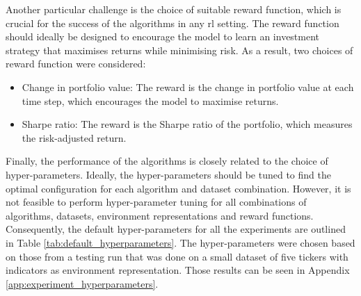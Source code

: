 Another particular challenge is the choice of suitable reward function, which is crucial for the success of the algorithms in any \acrshort{rl} setting. The reward function should ideally be designed to encourage the model to learn an investment strategy that maximises returns while minimising risk. As a result, two choices of reward function were considered:
\begin{itemize}
    \item Change in portfolio value: The reward is the change in portfolio value at each time step, which encourages the model to maximise returns.
    \item Sharpe ratio: The reward is the Sharpe ratio of the portfolio, which measures the risk-adjusted return.
\end{itemize}

Finally, the performance of the algorithms is closely related to the choice of hyper-parameters. Ideally, the hyper-parameters should be tuned to find the optimal configuration for each algorithm and dataset combination. However, it is not feasible to perform hyper-parameter tuning for all combinations of algorithms, datasets, environment representations and reward functions. Consequently, the default hyper-parameters for all the experiments are outlined in Table \ref{tab:default_hyperparameters}. The hyper-parameters were chosen based on those from a testing run that was done on a small dataset of five tickers with indicators as environment representation. Those results can be seen in Appendix \ref{app:experiment_hyperparameters}.



